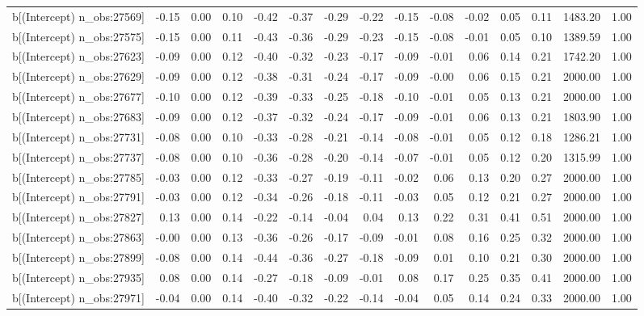 \begin{table}[ht]
\begin{tabular}{rrrrrrrrrrrrrrr}
  b[(Intercept) n\_obs:27569] & -0.15 & 0.00 & 0.10 & -0.42 & -0.37 & -0.29 & -0.22 & -0.15 & -0.08 & -0.02 & 0.05 & 0.11 & 1483.20 & 1.00 \\ 
  b[(Intercept) n\_obs:27575] & -0.15 & 0.00 & 0.11 & -0.43 & -0.36 & -0.29 & -0.23 & -0.15 & -0.08 & -0.01 & 0.05 & 0.10 & 1389.59 & 1.00 \\ 
  b[(Intercept) n\_obs:27623] & -0.09 & 0.00 & 0.12 & -0.40 & -0.32 & -0.23 & -0.17 & -0.09 & -0.01 & 0.06 & 0.14 & 0.21 & 1742.20 & 1.00 \\ 
  b[(Intercept) n\_obs:27629] & -0.09 & 0.00 & 0.12 & -0.38 & -0.31 & -0.24 & -0.17 & -0.09 & -0.00 & 0.06 & 0.15 & 0.21 & 2000.00 & 1.00 \\ 
  b[(Intercept) n\_obs:27677] & -0.10 & 0.00 & 0.12 & -0.39 & -0.33 & -0.25 & -0.18 & -0.10 & -0.01 & 0.05 & 0.13 & 0.21 & 2000.00 & 1.00 \\ 
  b[(Intercept) n\_obs:27683] & -0.09 & 0.00 & 0.12 & -0.37 & -0.32 & -0.24 & -0.17 & -0.09 & -0.01 & 0.06 & 0.13 & 0.21 & 1803.90 & 1.00 \\ 
  b[(Intercept) n\_obs:27731] & -0.08 & 0.00 & 0.10 & -0.33 & -0.28 & -0.21 & -0.14 & -0.08 & -0.01 & 0.05 & 0.12 & 0.18 & 1286.21 & 1.00 \\ 
  b[(Intercept) n\_obs:27737] & -0.08 & 0.00 & 0.10 & -0.36 & -0.28 & -0.20 & -0.14 & -0.07 & -0.01 & 0.05 & 0.12 & 0.20 & 1315.99 & 1.00 \\ 
  b[(Intercept) n\_obs:27785] & -0.03 & 0.00 & 0.12 & -0.33 & -0.27 & -0.19 & -0.11 & -0.02 & 0.06 & 0.13 & 0.20 & 0.27 & 2000.00 & 1.00 \\ 
  b[(Intercept) n\_obs:27791] & -0.03 & 0.00 & 0.12 & -0.34 & -0.26 & -0.18 & -0.11 & -0.03 & 0.05 & 0.12 & 0.21 & 0.27 & 2000.00 & 1.00 \\ 
  b[(Intercept) n\_obs:27827] & 0.13 & 0.00 & 0.14 & -0.22 & -0.14 & -0.04 & 0.04 & 0.13 & 0.22 & 0.31 & 0.41 & 0.51 & 2000.00 & 1.00 \\ 
  b[(Intercept) n\_obs:27863] & -0.00 & 0.00 & 0.13 & -0.36 & -0.26 & -0.17 & -0.09 & -0.01 & 0.08 & 0.16 & 0.25 & 0.32 & 2000.00 & 1.00 \\ 
  b[(Intercept) n\_obs:27899] & -0.08 & 0.00 & 0.14 & -0.44 & -0.36 & -0.27 & -0.18 & -0.09 & 0.01 & 0.10 & 0.21 & 0.30 & 2000.00 & 1.00 \\ 
  b[(Intercept) n\_obs:27935] & 0.08 & 0.00 & 0.14 & -0.27 & -0.18 & -0.09 & -0.01 & 0.08 & 0.17 & 0.25 & 0.35 & 0.41 & 2000.00 & 1.00 \\ 
  b[(Intercept) n\_obs:27971] & -0.04 & 0.00 & 0.14 & -0.40 & -0.32 & -0.22 & -0.14 & -0.04 & 0.05 & 0.14 & 0.24 & 0.33 & 2000.00 & 1.00 \\ 

\end{tabular}
\end{table}
